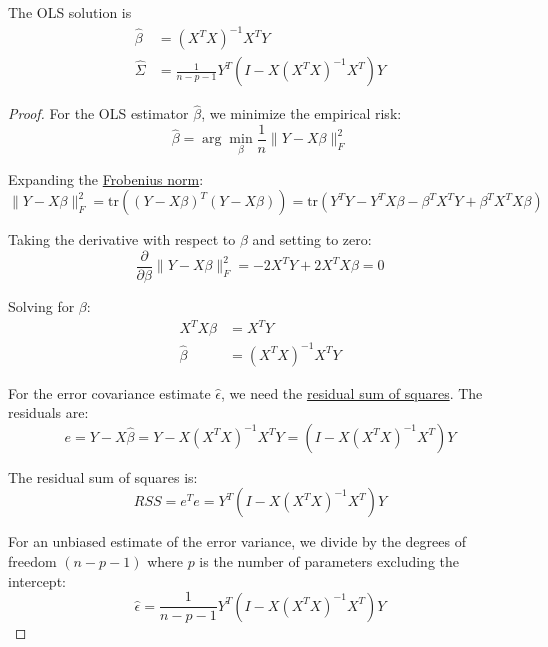   \begin{theorem}
    \label{thm:least-squares-solution}
    The OLS solution is 
    \begin{align}
      \hat{\beta} & = (X^T X)^{-1} X^T Y \\ 
      \hat{\Sigma} & = \frac{1}{n - p - 1} Y^T (I - X (X^T X)^{-1} X^T) Y
    \end{align}
  \end{theorem} 
  \begin{proof}
    For the OLS estimator $\hat{\beta}$, we minimize the empirical risk:
    \begin{equation}
      \hat{\beta} = \arg\min_{\beta} \frac{1}{n} \|Y - X\beta\|_F^2
    \end{equation}
   
    Expanding the \hyperref[lin-def:frobenius-norm-2]{Frobenius norm}:
    \begin{equation}
      \|Y - X\beta\|_F^2 = \text{tr}((Y - X\beta)^T(Y - X\beta)) = \text{tr}(Y^TY - Y^TX\beta - \beta^TX^TY + \beta^TX^TX\beta)
    \end{equation}
   
    Taking the derivative with respect to $\beta$ and setting to zero:
    \begin{equation}
      \frac{\partial}{\partial \beta} \|Y - X\beta\|_F^2 = -2X^TY + 2X^TX\beta = 0
    \end{equation}
   
    Solving for $\beta$:
    \begin{align}
      X^TX\beta &= X^TY \\
      \hat{\beta} &= (X^TX)^{-1}X^TY
    \end{align}
   
    For the error covariance estimate $\hat{\epsilon}$, we need the \hyperref[def:residual-sum-of-squares]{residual sum of squares}. The residuals are:
    \begin{equation}
      e = Y - X\hat{\beta} = Y - X(X^TX)^{-1}X^TY = (I - X(X^TX)^{-1}X^T)Y
    \end{equation}
   
    The residual sum of squares is:
    \begin{equation}
      RSS = e^Te = Y^T(I - X(X^TX)^{-1}X^T)Y
    \end{equation}
   
    For an unbiased estimate of the error variance, we divide by the degrees of freedom $(n - p - 1)$ where $p$ is the number of parameters  excluding the intercept:
    \begin{equation}
      \hat{\epsilon} = \frac{1}{n - p - 1} Y^T(I - X(X^TX)^{-1}X^T)Y
    \end{equation}
  \end{proof}

